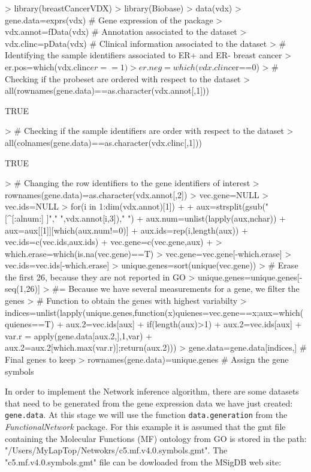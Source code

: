\documentclass[12pt]{article}
\newcommand{\Robject}[1]{{\texttt{#1}}}
\newcommand{\Rfunction}[1]{{\texttt{#1}}}
\newcommand{\Rpackage}[1]{\textit{#1}}
\begin{document}
\begin{Schunk}
\begin{Sinput}
> library(breastCancerVDX)
> library(Biobase)
> data(vdx)
> gene.data=exprs(vdx)   # Gene expression of the package
> vdx.annot=fData(vdx)   # Annotation associated to the dataset
> vdx.clinc=pData(vdx)   # Clinical information associated to the dataset 
> # Identifying the sample identifiers associated to ER+ and ER- breast cancer
> er.pos=which(vdx.clinc$er==1)
> er.neg=which(vdx.clinc$er==0)
> # Checking if the probeset are ordered with respect to the dataset
> all(rownames(gene.data)==as.character(vdx.annot[,1]))  
\end{Sinput}
\begin{Soutput}
[1] TRUE
\end{Soutput}
\begin{Sinput}
> # Checking if the sample identifiers are order with respect to the dataset
> all(colnames(gene.data)==as.character(vdx.clinc[,1]))  
\end{Sinput}
\begin{Soutput}
[1] TRUE
\end{Soutput}
\begin{Sinput}
> # Changing the row identifiers to the gene identifiers of interest
> rownames(gene.data)=as.character(vdx.annot[,2])        
> vec.gene=NULL
> vec.ids=NULL
> for(i in 1:dim(vdx.annot)[1])
+ {
+   aux=strsplit(gsub("[^[:alnum:] ]"," ",vdx.annot[i,3])," ")
+ 	aux.num=unlist(lapply(aux,nchar))
+ 	aux=aux[[1]][which(aux.num!=0)]
+ 	aux.ids=rep(i,length(aux))
+  	vec.ids=c(vec.ids,aux.ids)	
+     	vec.gene=c(vec.gene,aux)
+ }
> which.erase=which(is.na(vec.gene)==T)
> vec.gene=vec.gene[-which.erase]
> vec.ids=vec.ids[-which.erase]
> unique.genes=sort(unique(vec.gene))
> # Erase the first 26, because they are not reported in GO
> unique.genes=unique.genes[-seq(1,26)] 
> #= Because we have several measurements for a gene, we filter the genes
> # Function to obtain the genes with highest variabilty 
> indices=unlist(lapply(unique.genes,function(x){quienes=vec.gene==x;aux=which(quienes==T)
+ 	     aux.2=vec.ids[aux] 
+          if(length(aux)>1){
+          	    aux.2=vec.ids[aux]  
+  				var.r = apply(gene.data[aux.2,],1,var)
+ 				aux.2=aux.2[which.max(var.r)]};return(aux.2)})) 
> gene.data=gene.data[indices,]   # Final genes to keep
> rownames(gene.data)=unique.genes # Assign the gene symbols
\end{Sinput}
\end{Schunk}
\normalsize 
In order to implement the Network inference algorithm, there are some datasets that need to be generated from the gene expression data we have just created: \Robject{gene.data}. At this stage we will use the function \Rfunction{data.generation} from the \Rpackage{FunctionalNetwork} package. For this example it is assumed that the gmt file containing the Molecular Functions (MF) ontology from GO is stored in the path: "/Users/MyLapTop/Netwokrs/c5.mf.v4.0.symbols.gmt". The "c5.mf.v4.0.symbols.gmt" file can be dowloaded from the MSigDB web site:\\
\end{document}
